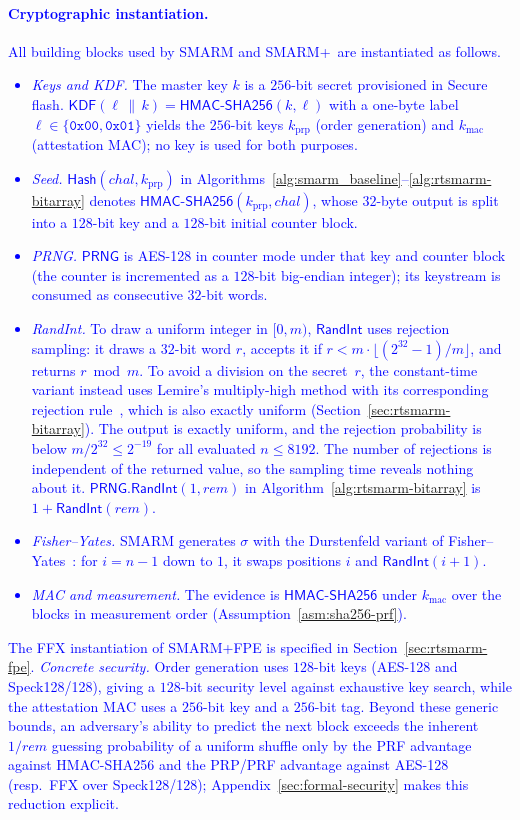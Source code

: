 \documentclass[journal]{IEEEtran}
\newcommand\ben[1]{\textcolor{blue}{#1}}
\newcommand{\rtsmarm}{SMARM+\xspace}
\newcommand{\rtsmarmtwo}{SMARM+FPE\xspace}
\begin{document}
\paragraph{\ben{Cryptographic instantiation.}}
\ben{All building blocks used by SMARM and \rtsmarm\ are instantiated as follows.
\begin{itemize}
  \item \emph{Keys and KDF.} The master key $k$ is a $256$-bit secret provisioned in Secure flash.
  $\mathsf{KDF}(\ell \,\|\, k) = \mathsf{HMAC\text{-}SHA256}(k, \ell)$ with a one-byte label $\ell \in \{\texttt{0x00}, \texttt{0x01}\}$ yields the $256$-bit keys $k_{\mathrm{prp}}$ (order generation) and $k_{\mathrm{mac}}$ (attestation MAC); no key is used for both purposes.
  \item \emph{Seed.} $\mathsf{Hash}(chal, k_{\mathrm{prp}})$ in Algorithms~\ref{alg:smarm_baseline}--\ref{alg:rtsmarm-bitarray} denotes $\mathsf{HMAC\text{-}SHA256}(k_{\mathrm{prp}}, chal)$, whose $32$-byte output is split into a $128$-bit key and a $128$-bit initial counter block.
  \item \emph{PRNG.} $\mathsf{PRNG}$ is AES-128 in counter mode under that key and counter block (the counter is incremented as a $128$-bit big-endian integer); its keystream is consumed as consecutive $32$-bit words.
  \item \emph{RandInt.} To draw a uniform integer in $[0, m)$, $\mathsf{RandInt}$ uses rejection sampling: it draws a $32$-bit word $r$, accepts it if $r < m \cdot \lfloor (2^{32}-1)/m \rfloor$, and returns $r \bmod m$. To avoid a division on the secret~$r$, the constant-time variant instead uses Lemire's multiply-high method with its corresponding rejection rule~\cite{lemire2019fast}, which is also exactly uniform (Section~\ref{sec:rtsmarm-bitarray}).
  The output is exactly uniform, and the rejection probability is below $m/2^{32} \le 2^{-19}$ for all evaluated $n \le 8192$.
  The number of rejections is independent of the returned value, so the sampling time reveals nothing about it.
  $\mathsf{PRNG.RandInt}(1, rem)$ in Algorithm~\ref{alg:rtsmarm-bitarray} is $1 + \mathsf{RandInt}(rem)$.
  \item \emph{Fisher--Yates.} SMARM generates $\sigma$ with the Durstenfeld variant of Fisher--Yates~\cite{fisherYates}: for $i = n-1$ down to $1$, it swaps positions $i$ and $\mathsf{RandInt}(i+1)$.
  \item \emph{MAC and measurement.} The evidence is $\mathsf{HMAC\text{-}SHA256}$ under $k_{\mathrm{mac}}$ over the blocks in measurement order (Assumption~\ref{asm:sha256-prf}).
\end{itemize}
The FFX instantiation of \rtsmarmtwo is specified in Section~\ref{sec:rtsmarm-fpe}.
\emph{Concrete security.} Order generation uses $128$-bit keys (AES-128 and Speck128/128), giving a $128$-bit security level against exhaustive key search, while the attestation MAC uses a $256$-bit key and a $256$-bit tag.
Beyond these generic bounds, an adversary's ability to predict the next block exceeds the inherent $1/rem$ guessing probability of a uniform shuffle only by the PRF advantage against HMAC-SHA256 and the PRP/PRF advantage against AES-128 (resp.\ FFX over Speck128/128); Appendix~\ref{sec:formal-security} makes this reduction explicit.}
\end{document}
